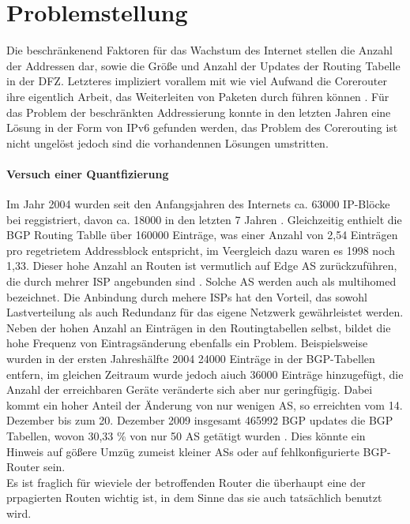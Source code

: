 \section{Problemstellung}
Die beschränkenend Faktoren für das Wachstum des Internet stellen die Anzahl der Addressen dar, sowie die Größe und Anzahl der Updates der Routing Tabelle in der DFZ. Letzteres impliziert vorallem mit wie viel Aufwand die Corerouter ihre eigentlich Arbeit, das Weiterleiten von Paketen durch führen können \cite{Huston:2003:BGP}. Für das Problem der beschränkten Addressierung konnte in den letzten Jahren eine Lösung in der Form von IPv6 gefunden werden, das Problem des Corerouting ist nicht ungelöst jedoch sind die vorhandennen Lösungen umstritten.

\paragraph{Versuch einer Quantfizierung}
Im Jahr 2004 wurden seit den Anfangsjahren des Internets ca. 63000 IP-Blöcke bei reggistriert, davon ca. 18000 in den letzten 7 Jahren \cite{journals/ccr/MengXZHLZ04}. Gleichzeitig enthielt die BGP Routing Tablle über 160000 Einträge, was einer Anzahl von 2,54 Einträgen pro regetrietem Addressblock entspricht, im Veergleich dazu waren es 1998 noch 1,33. Dieser hohe Anzahl an Routen ist vermutlich auf Edge AS zurückzuführen, die durch mehrer ISP angebunden sind \cite{jen:2008:start}. Solche AS werden auch als multihomed bezeichnet. Die Anbindung durch mehere ISPs hat den Vorteil, das sowohl Lastverteilung als auch Redundanz für das eigene Netzwerk gewährleistet werden. \\ 
Neben der hohen Anzahl an Einträgen in den Routingtabellen selbst, bildet die hohe Frequenz von Eintragsänderung ebenfalls ein Problem. Beispielsweise wurden in der ersten Jahreshälfte 2004 24000 Einträge in der BGP-Tabellen entfern, im gleichen Zeitraum wurde jedoch aiuch 36000 Einträge hinzugefügt, die Anzahl der erreichbaren Geräte veränderte sich aber nur geringfügig. Dabei kommt ein hoher Anteil der Änderung von nur wenigen AS, so erreichten vom 14. Dezember bis zum 20. Dezember 2009 insgesamt 465992 BGP updates die BGP Tabellen, wovon 30,33 \% von nur 50 AS getätigt wurden \cite{Huston:aktuell:BGP}. Dies könnte ein Hinweis auf gößere Umzüg zumeist kleiner ASs oder auf fehlkonfigurierte BGP-Router sein. \\
Es ist fraglich für wieviele der betroffenden Router die überhaupt eine der prpagierten Routen wichtig ist, in dem Sinne das sie auch tatsächlich benutzt wird.

